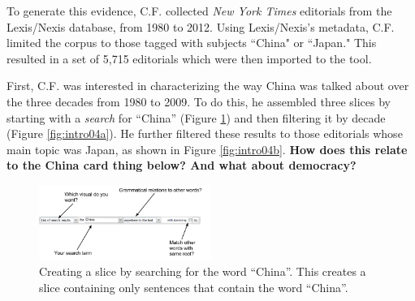 \documentclass{sig-alternate}
\newcommand{\strong}[1] {\textbf{#1}}
\begin{document}
To generate this evidence, C.F. collected \emph{New York Times} editorials from  the Lexis/Nexis database, from 1980 to 2012. Using Lexis/Nexis's metadata, C.F. limited the corpus to those tagged with subjects ``China" or ``Japan." This resulted in a set of 5,715 editorials which were then imported to the tool.

First, C.F. was interested in characterizing the way China was talked about over the three decades from 1980 to 2009. To do this, he assembled three slices by starting with a \emph{search} for ``China'' (Figure \ref{fig:intro03})  and then filtering it by decade (Figure \ref{fig:intro04a}).  He further filtered these results to those editorials whose main topic was Japan, as shown in Figure \ref{fig:intro04b}. \strong{How does this relate to the China card thing below?  And what about democracy?}

\begin{figure}[ht!]
\begin{center}
	\includegraphics[width=0.5\textwidth]{fig/intro/03b.png}
\end{center}
    \caption{%
        Creating a slice by searching for the word ``China''. This creates a slice containing only sentences that contain the word ``China''. \label{fig:intro03}
     }%
\end{figure}
\end{document}
